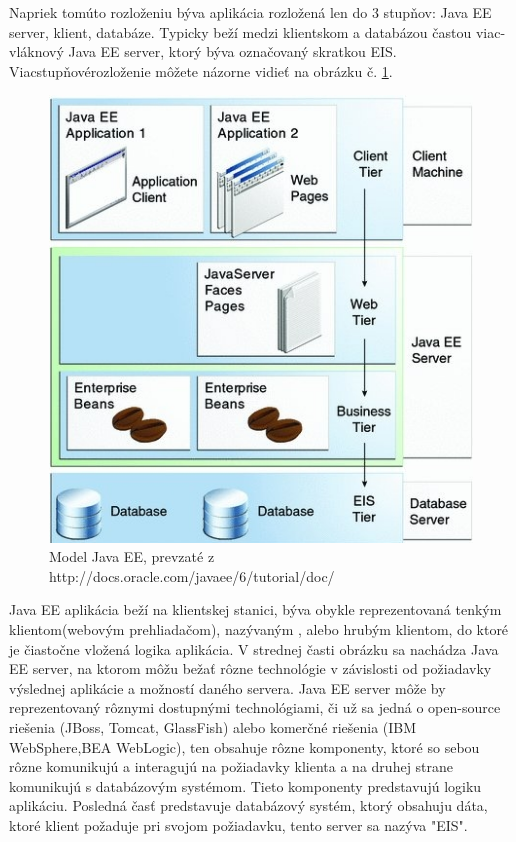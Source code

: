 Napriek tomúto rozloženiu býva aplikácia rozložená len do 3 stupňov: Java EE server, klient, databáze. Typicky beží medzi klientskom a databázou častou viac-vláknový Java EE server, ktorý býva označovaný skratkou EIS. Viacstupňovérozloženie môžete názorne vidieť na obrázku č. \ref{model}.
\begin{figure}[htb]

\begin{center}

\includegraphics[scale=0.5]{model.jpg} 
\caption{Model Java EE, prevzaté z  http://docs.oracle.com/javaee/6/tutorial/doc/}
\label{model}

\end{center}

\end{figure}
Java EE aplikácia beží na klientskej stanici, býva obykle reprezentovaná tenkým klientom(webovým prehliadačom), nazývaným , alebo hrubým klientom, do ktoré je čiastočne vložená logika aplikácia. V strednej časti obrázku sa nachádza Java EE server, na ktorom môžu bežať rôzne technológie v závislosti od požiadavky výslednej aplikácie a možností daného servera. Java EE server môže by reprezentovaný rôznymi dostupnými technológiami, či už sa jedná o open-source riešenia (JBoss, Tomcat, GlassFish) alebo komerčné riešenia (IBM WebSphere,BEA WebLogic), ten obsahuje rôzne komponenty, ktoré so sebou rôzne komunikujú a interagujú na požiadavky klienta a na druhej strane komunikujú s databázovým systémom. Tieto komponenty predstavujú logiku aplikáciu. Posledná časť predstavuje databázový systém, ktorý obsahuju dáta, ktoré klient požaduje pri svojom požiadavku, tento server sa nazýva "EIS".

